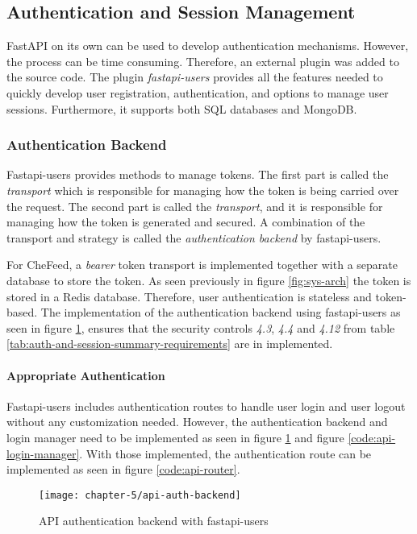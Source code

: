 \subsection{Authentication and Session Management}
FastAPI on its own can be used to develop authentication mechanisms. However, the process can be time consuming. Therefore, an external plugin was added to the source code. The plugin \emph{fastapi-users} provides all the features needed to quickly develop user registration, authentication, and options to manage user sessions. Furthermore, it supports both SQL databases and MongoDB. 

\subsubsection{Authentication Backend}
Fastapi-users provides methods to manage tokens. The first part is called the \emph{transport} which is responsible for managing how the token is being carried over the request. The second part is called the \emph{transport}, and it is responsible for managing how the token is generated and secured. A combination of the transport and strategy is called the \emph{authentication backend} by fastapi-users.

For CheFeed, a \emph{bearer} token transport is implemented together with a separate database to store the token. As seen previously in figure \ref{fig:sys-arch} the token is stored in a Redis database. Therefore, user authentication is stateless and token-based. The implementation of the authentication backend using fastapi-users as seen in figure \ref{code:api-auth-backend}, ensures that the security controls \emph{4.3}, \emph{4.4} and \emph{4.12} from table \ref{tab:auth-and-session-summary-requirements} are in implemented. 

\paragraph{Appropriate Authentication}
Fastapi-users includes authentication routes to handle user login and user logout without any customization needed. However, the authentication backend and login manager need to be implemented as seen in figure \ref{code:api-auth-backend} and figure \ref{code:api-login-manager}. With those implemented, the authentication route can be implemented as seen in figure \ref{code:api-router}.

\begin{figure}
    \centering
    \texttt{[image: chapter-5/api-auth-backend]}
    \caption{API authentication backend with fastapi-users}
    \label{code:api-auth-backend}
\end{figure}

